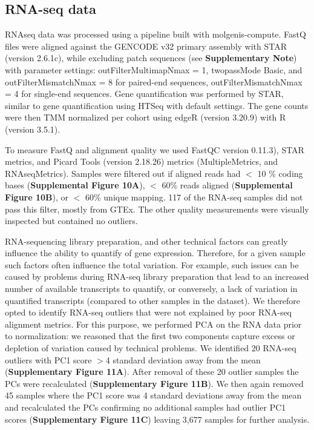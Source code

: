 {{\subsection{RNA-seq data}
RNAseq data was processed using a pipeline built with molgenis-compute\cite{byelasMOLGENISBasedComputational2011}. FastQ files were aligned against the GENCODE\cite{frankishGENCODEReferenceAnnotation2019} v32 primary assembly with STAR\cite{dobinSTARUltrafastUniversal2013} (version 2.6.1c), while excluding patch sequences (see \textbf{Supplementary Note}) with parameter settings: outFilterMultimapNmax = 1, twopassMode Basic, and outFilterMismatchNmax = 8 for paired-end sequences, outFilterMismatchNmax = 4 for single-end sequences. Gene quantification was performed by STAR, similar to gene quantification using HTSeq\cite{andersHTSeqPythonFramework2015} with default settings. The gene counts were then TMM\cite{robinsonScalingNormalizationMethod2010} normalized per cohort using edgeR\cite{robinsonEdgeRBioconductorPackage2010} (version 3.20.9) with R\cite{rcoreteamLanguageEnvironmentStatistical2017} (version 3.5.1). 

To measure FastQ and alignment quality we used FastQC\cite{BabrahamBioinformaticsFastQC} version 0.11.3), STAR metrics, and Picard Tools\cite{broadinstitutePicardTools2019} (version 2.18.26) metrics (MultipleMetrics, and RNAseqMetrics). Samples were filtered out if aligned reads had $<$ 10
\% coding bases (\textbf{Supplemental Figure 10A}), $<$ 60\% reads aligned (\textbf{Supplemental Figure 10B}), or $<$ 60\% unique mapping. 117 of the RNA-seq samples did not pass this filter, mostly from GTEx\cite{consortiumGTExConsortiumAtlas2020}. The other quality measurements were visually inspected but contained no outliers. 

RNA-sequencing library preparation, and other technical factors can greatly influence the ability to quantify of gene expression. Therefore, for a given sample such factors often influence the total variation. For example, such issues can be caused by problems during RNA-seq library preparation that lead to an increased number of available transcripts to quantify, or conversely, a lack of variation in quantified transcripts (compared to other samples in the dataset). We therefore opted to identify RNA-seq outliers that were not explained by poor RNA-seq alignment metrics. For this purpose, we performed PCA on the RNA data prior to normalization: we reasoned that the first two components capture excess or depletion of variation caused by technical problems. We identified 20 RNA-seq outliers with PC1 score $>$4 standard deviation away from the mean (\textbf{Supplementary Figure 11A}). After removal of these 20 outlier samples the PCs were recalculated (\textbf{Supplementary Figure 11B}). We then again removed 45 samples where the PC1 score was 4 standard deviations away from the mean and recalculated the PCs confirming no additional samples had outlier PC1 scores (\textbf{Supplementary Figure 11C}) leaving 3,677 samples for further analysis. 



}}
